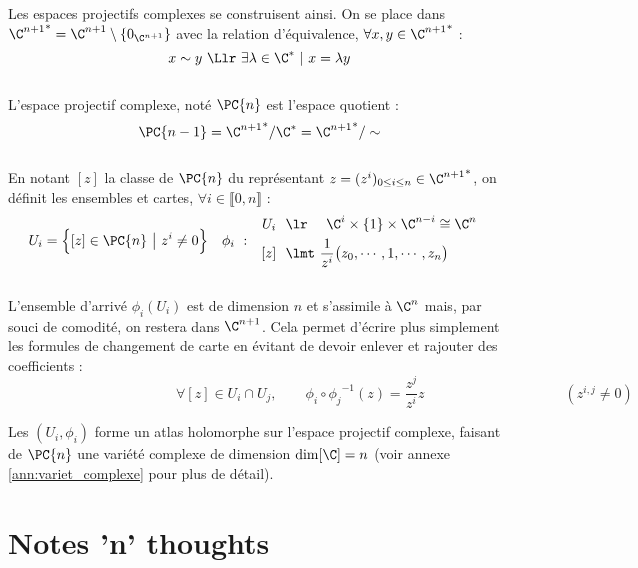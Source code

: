 Les espaces projectifs complexes se construisent ainsi. On se place dans ${\C^{n+1}}^*=\C^{n+1}\setminus\{0_{\C^{n+1}}\}$ avec la relation d'équivalence, $\forall x,y\in{\C^{n+1}}^*$ :
\[x \sim y\ \Llr\ \exists \lambda\in\C^*\ |\ x=\lambda y\]
\\
L'espace projectif complexe, noté $\PC{n}$ est l'espace quotient :
\[\PC{n-1} = {\C^{n+1}}^*/\C^* = {\C^{n+1}}^*/\sim\]
\\
En notant $[z]$ la classe de $\PC{n}$ du représentant $z = (z^i)_{0\leq i\leq n}\in{\C^{n+1}}^*$, on définit les ensembles et cartes, $\forall i\in\llbracket0,n\rrbracket$ :
\begin{align}
	U_i &= \Big\{[z]\in\PC{n}\ \big|\ z^i\neq 0\Big\}  &  \phi_i\  :\quad &\begin{aligned}
		U_i\ \ &\lr\quad\ \C^{i}\times \{1\} \times\C^{n-i}\cong \C^{n} \\ [z]\ \ &\lmt\ \frac{1}{z^i}\big(z_0,\cdots, 1,\cdots, z_n\big)
	\end{aligned}
\end{align}
\\
L'ensemble d'arrivé $\phi_i(U_i)$ est de dimension $n$ et s'assimile à $\C^{n}$ mais, par souci de comodité, on restera dans $\C^{n+1}$. Cela permet  d'écrire plus simplement les formules de changement de carte en évitant de devoir enlever et rajouter des coefficients :
\[\qquad\qquad\qquad\qquad\qquad\qquad \forall [z]\in U_i\cap U_j,\qquad \phi_i \circ {\phi_j}^{-1}(z) = \frac{z^j}{z^i}z\qquad\qquad\qquad\qquad\qquad (z^{i,j}\neq 0) \qquad\]

Les $(U_i,\phi_i)$ forme un atlas holomorphe sur l'espace projectif complexe, faisant de $\PC{n}$ une variété complexe de dimension $\dim[\C] = n$ (voir annexe \ref{ann:variet_complexe} pour plus de détail).









\part{Notes 'n' thoughts}

 







\newpage

\listoffigures
\vfill
\lstlistoflistings
\vfill

\newpage

{}


